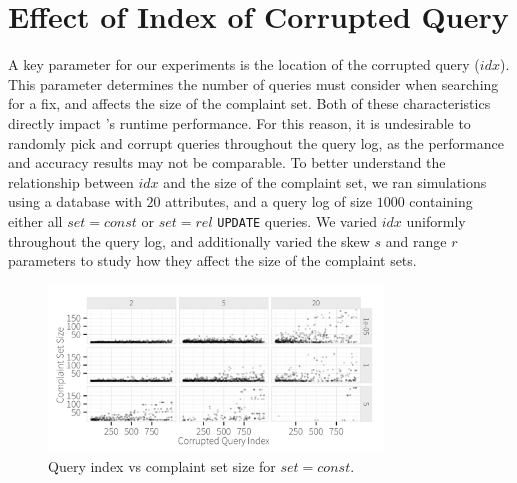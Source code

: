 \section{Effect of Index of Corrupted Query}
\label{app:qidx}


A key parameter for our experiments is the location of the corrupted query ($idx$).  
This parameter determines the number of queries \sys must consider when searching for a fix,
and affects the size of the complaint set.  
Both of these characteristics directly impact \sys's 
runtime performance. For this reason, it is undesirable to randomly pick and corrupt queries
throughout the query log, as the performance and accuracy results may not be comparable. 
To better understand the relationship between $idx$ and the size of the complaint set, we ran
simulations using a database with $20$ attributes, and a query log of size $1000$ containing
either all $set = const$ or $set = rel$ \texttt{UPDATE} queries.
We varied  $idx$ uniformly throughout the query log, and additionally varied
the skew $s$ and range $r$ parameters to study how they affect the size of the complaint sets.


  \begin{figure}[h]
  \centering
  \includegraphics[width = 3.5in]{figures/qidxsimulation/qidx_v_ncomplaints_20attrs_const}
  \caption{Query index vs complaint set size for $set = const$.}
  \label{f:qidx_v_ncomplaints_const} 
  \end{figure}



